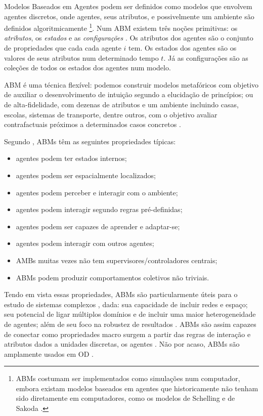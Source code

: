 Modelos Baseados em Agentes podem ser definidos como modelos que envolvem
agentes discretos, onde agentes, seus atributos, e possivelmente um ambiente são
definidos algoritmicamente \cite{sayama2015introduction} \footnote{ ABMs
  costumam ser implementados como simulações num computador, embora existam
  modelos baseados em agentes que historicamente não tenham sido diretamente em
  computadores, como os modelos de Schelling e de Sakoda
  \cite{hegselmann2017thomas}.}. Num ABM existem três noções primitivas: os
\textit{atributos}, os \textit{estados} e as \textit{configurações}
\cite{de2014agent}. Os atributos dos agentes são o conjunto de propriedades
que cada cada agente \(i\) tem. Os estados dos agentes são os valores de seus
atributos num determinado tempo \(t\). Já as configurações são as coleções de
todos os estados dos agentes num modelo.

ABM é uma técnica flexível: podemos construir modelos metafóricos com
objetivo de auxiliar o desenvolvimento de intuição segundo a elucidação de
princípios; ou de alta-fidelidade, com dezenas de atributos e um
ambiente incluindo casas, escolas, sistemas de transporte, dentre outros, com o
objetivo avaliar contrafactuais próximos a determinados casos concretos
\cite{de2014agent, epstein2006generative}.


Segundo , ABMs têm as seguintes
propriedades típicas:
\begin{itemize}
\item agentes podem ter estados internos;
\item agentes podem ser espacialmente localizados;
\item agentes podem perceber e interagir com o ambiente;
\item agentes podem interagir segundo regras pré-definidas;
\item agentes podem ser capazes de aprender e adaptar-se;
\item agentes podem interagir com outros agentes;
\item AMBs muitas vezes não tem supervisores/controladores centrais;
  \item ABMs podem produzir comportamentos coletivos não triviais.
  \end{itemize}

  Tendo em vista essas propriedades, ABMs são particularmente úteis para o
  estudo de sistemas complexos \cite{wilensky2015introduction}, dada: sua
  capacidade de incluir redes e espaço; seu potencial de ligar múltiplos
  domínios e de incluir uma maior heterogeneidade de agentes; além de seu foco
  na robustez de resultados \cite{de2014agent,wilensky2015introduction}. ABMs
  são assim capazes de conectar como propriedades macro surgem a partir das
  regras de interação e atributos dados a unidades discretas, os agentes
  \cite{north2007managing}. Não por acaso, ABMs são amplamente usados em OD
  \cite{castellano2012social,flache2017}.

